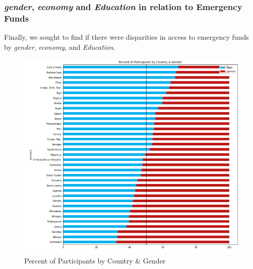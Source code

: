 \documentclass[water,article,submit,moreauthors,pdftex]{mdpi}
\begin{document}
\hypertarget{gender-economy-and-education-in-relation-to-emergency-funds}{%
\subsubsection{\texorpdfstring{\emph{gender}, \emph{economy} and
\emph{Education} in relation to Emergency
Funds}{gender, economy and Education in relation to Emergency Funds}}\label{gender-economy-and-education-in-relation-to-emergency-funds}}

Finally, we sought to find if there were disparities in access to
emergency funds by \emph{gender}, \emph{economy}, and \emph{Education}.

\begin{figure}
\centering
\includegraphics[width=\textwidth,height=0.5\textheight]{images/percent_participants_by_country_gender.png}
\caption{Percent of Participants by Country \& Gender}
\end{figure}
\end{document}
